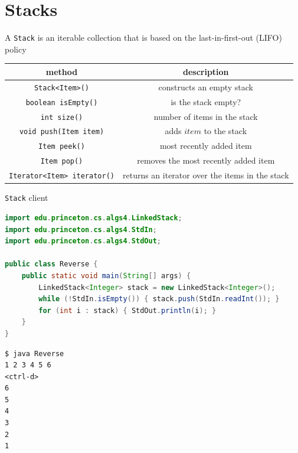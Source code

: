 \documentclass[8pt,a4paper,compress]{beamer}
\begin{document}
\section{Stacks}
\begin{frame}[fragile]
\pause

A \lstinline{Stack} is an iterable collection that is based on the last-in-first-out (LIFO) policy

\begin{center}
\begin{tabular}{cc}
method & description \\ \hline
\lstinline$Stack<Item>()$ & constructs an empty stack \\
\lstinline$boolean isEmpty()$ & is the stack empty? \\
\lstinline$int size()$ & number of items in the stack \\
\lstinline$void push(Item item)$ & adds $item$ to the stack \\
\lstinline$Item peek()$ & most recently added item \\
\lstinline$Item pop()$ & removes the most recently added item \\
\lstinline$Iterator<Item> iterator()$ & returns an iterator over the items in the stack
\end{tabular} 
\end{center}

\pause

\lstinline{Stack} client
\begin{lstlisting}[language=Java]
import edu.princeton.cs.algs4.LinkedStack;
import edu.princeton.cs.algs4.StdIn;
import edu.princeton.cs.algs4.StdOut;

public class Reverse {
    public static void main(String[] args) {
        LinkedStack<Integer> stack = new LinkedStack<Integer>();
        while (!StdIn.isEmpty()) { stack.push(StdIn.readInt()); }
        for (int i : stack) { StdOut.println(i); }
    }
}
\end{lstlisting}

\pause

\begin{lstlisting}[language={}]
$ java Reverse 
1 2 3 4 5 6
<ctrl-d>
6
5
4
3
2
1
\end{lstlisting}
\end{frame}
\end{document}

